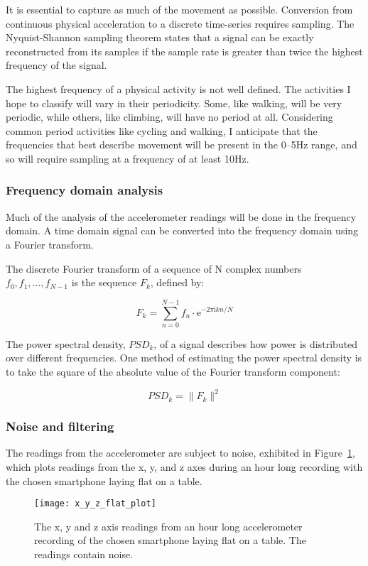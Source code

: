     It is essential to capture as much of the movement as possible. Conversion from continuous 
    physical acceleration to a discrete time-series requires sampling. The Nyquist-Shannon sampling theorem states that a signal can be exactly reconstructed from its samples if the sample rate is greater than twice the highest frequency of the signal.
    
    The highest frequency of a physical activity is not well defined. The activities I hope to classify will vary in their periodicity. Some, like walking, will be very periodic, while others, like climbing, will have no period at all. Considering common period activities like cycling and walking, I anticipate that the frequencies that best describe movement will be present in the 0--5\si{Hz} range, and so will require sampling at a frequency of at least 10\si{Hz}.
    
    \subsubsection{Frequency domain analysis}
      Much of the analysis of the accelerometer readings will be done in the frequency domain. A time domain signal can be converted into the frequency domain using a Fourier transform.
      
      The discrete Fourier transform of a sequence of N complex numbers $f_0, f_1, \ldots, f_{N-1}$ is the sequence $F_k$, defined by:
      
      $$F_k = \sum\limits_{n=0}^{N-1} f_n \cdot \mathrm{e}^{-2\pi \mathrm{i} kn/N}$$
      
      The power spectral density, $PSD_k$, of a signal describes how power is distributed over different frequencies. One method of estimating the power spectral density is to take the square of the absolute value of the Fourier transform component:
      
      $$PSD_k = \|F_k\|^2$$
      
    \subsubsection{Noise and filtering}
      The readings from the accelerometer are subject to noise, exhibited in 
      Figure~\ref{fig:x_y_z_flat_plot}, which plots readings from the x, y, and z axes during an hour long recording with the chosen smartphone laying flat on a table.
      
      \begin{figure}
        \centering
        \texttt{[image: x\_y\_z\_flat\_plot]}
        \caption{The x, y and z axis readings from an hour long accelerometer recording of the chosen smartphone laying flat on a table. The readings contain noise.}
        \label{fig:x_y_z_flat_plot}
      \end{figure}
      

